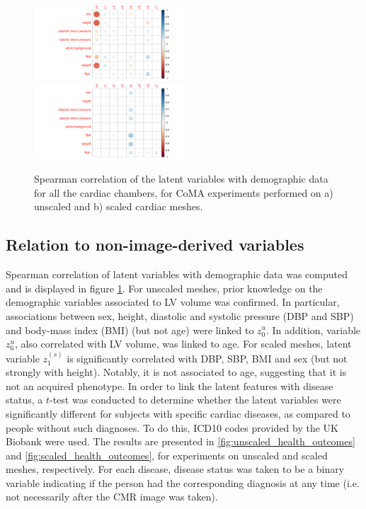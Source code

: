 \begin{figure}[ht!]
\includegraphics[width=0.5\textwidth]{figs/correlation/experiment_2_vs_demographic_data}
\includegraphics[width=0.5\textwidth]{figs/correlation/experiment_1_vs_demographic_data}
\caption{Spearman correlation of the latent variables with demographic data for all the cardiac chambers, for CoMA experiments performed on a) unscaled and b) scaled cardiac meshes.}
\label{fig:relation_to_demographic}
\end{figure}


\subsection*{Relation to non-image-derived variables}
\label{subsec_GWAS}
Spearman correlation of latent variables with demographic data was computed and is displayed in figure \ref{fig:relation_to_demographic}.
For unscaled meshes, prior knowledge on the demographic variables associated to LV volume was confirmed. In particular, associations between sex, height, diastolic and systolic pressure (DBP and SBP) and body-mass index (BMI) (but not age) were linked to $z_0^{u}$. In addition, variable $z_6^{u}$, also correlated with LV volume, was linked to age. For scaled meshes, latent variable $z_1^{(s)}$ is significantly correlated with DBP, SBP, BMI and sex (but not strongly with height). Notably, it is not associated to age, suggesting that it is not an acquired phenotype.
In order to link the latent features with disease status, a $t$-test was conducted to determine whether the latent variables were significantly different for subjects with specific cardiac diseases, as compared to people without such diagnoses. To do this, ICD10 codes provided by the UK Biobank were used. The results are presented in \ref{fig:unscaled_health_outcomes} and \ref{fig:scaled_health_outcomes}, for experiments on unscaled and scaled meshes, respectively. For each disease, disease status was taken to be a binary variable indicating if the person had the corresponding diagnosis at any time (i.e. not necessarily after the CMR image was taken).


